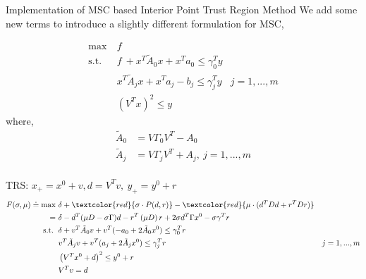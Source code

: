 \documentclass{beamerswitch}
\newcommand{\st}{\mathrm{s.t.\;}}
\newcommand{\red}[1]{\textcolor{red}{#1}}
\begin{document}
\begin{frame}[allowframebreaks]{  Implementation of MSC based Interior Point Trust Region Method  }
  We add some new terms to introduce a slightly different formulation for MSC,

  \begin{align*}
    \max ~ & f                                                                                                           \\
    \st ~  & f ~ + x^T\tilde A_0x + x^Ta_0                                                \le \gamma_0^T y               \\
           & x^T\tilde A_j x + x^T a_j - b_j \le \gamma_j^Ty                                               & j=1, ..., m \\
           & \left (V^Tx \right )^2 \le y
  \end{align*}
  where,
  \begin{align*}
    \tilde A_0 & = V\Gamma_0 V^T - A_0                \\
    \tilde A_j & = V\Gamma_j V^T + A_j, ~ j=1, ..., m \\
  \end{align*}

  \framebreak
  TRS: \(x_+ = x^0 + v, d = V^Tv, ~y_+ = y^0 + r\)
  \begin{equation}
    \begin{aligned}
      F(\sigma, \mu)\doteq  \max ~ & \delta  + \red{\sigma \cdot P(d, r)}  -  \red{\mu \cdot( d^TDd + r^TDr )}                                                         \\
      = ~                          & \delta  -  d^T (\mu D - \sigma \Gamma) d - r^T\left(\mu D\right)r  + 2 \sigma d^T \Gamma x^0 - \sigma \gamma^T r                  \\
      \st  ~                       & \delta + v^T\tilde A_0 v + v^T ( - a_0 + 2 \tilde A_0 x^0) \le \gamma_0^Tr                                                        \\
                                   & v^T\tilde A_j v + v^T (a_j + 2 \tilde A_jx^0)   \le  \gamma_j^Tr                                                 & j = 1 , ..., m \\
                                   & \left(V^Tx^0 + d\right)^2 \le y^0 + r                                                                                             \\
                                   & V^Tv = d                                                                                                                          \\
    \end{aligned}
  \end{equation}

\end{frame}
\end{document}
